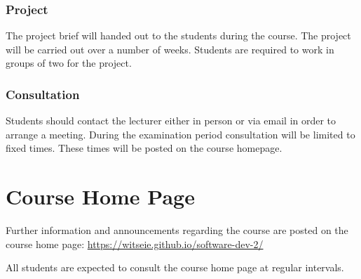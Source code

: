 \documentclass[11pt]{eie-cbo}
\begin{document}
\subsubsection{Project}
The project brief will handed out to the students during the course. The
project will be carried out over a number of weeks. Students are required to
work in groups of two for the project.

\subsubsection{Consultation}
Students should contact the lecturer either in person or via email in order to arrange a meeting. During the examination period consultation will be limited to fixed times. These times will be posted on the course homepage.

\section{Course Home Page}\label{web}
Further information and announcements regarding the course are posted on the course home page: \url{https://witseie.github.io/software-dev-2/}

All students are expected to consult the course home page at regular intervals.
\end{document}
